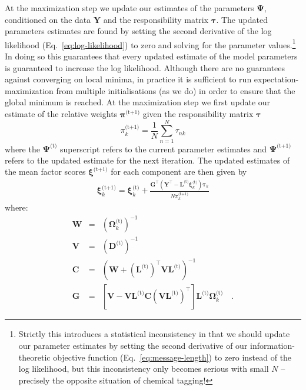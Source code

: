 \documentclass[twocolumn]{aastex62}
\newcommand{\vect}[1]{\boldsymbol{\mathbf{#1}}}
\renewcommand{\vec}[1]{\vect{#1}}
\newcommand{\weight}{\pi}
\newcommand{\data}{\textbf{Y}}
\newcommand{\vecdata}{\vec\data}
\newcommand{\nextstep}{^\textrm{(t+1)}}
\newcommand{\thisstep}{^\textrm{(t)}}
\newcommand{\transpose}{^\intercal}
\newcommand{\factorloads}{\textbf{L}}
\newcommand{\specificvariance}{\vec{D}}
\newcommand{\scoremeans}{\vec\xi}
\newcommand{\scorecovs}{\vec\Omega}
\newcommand{\NumData}{N}
\newcommand{\numdata}{n}
\newcommand{\numcomponents}{k}
\begin{document}
At the maximization step we update our estimates of the parameters $\vec\Psi$,
conditioned on the data $\vecdata$ and the responsibility matrix $\vec\tau$.
The updated parameters estimates are found by setting the second derivative
of the log likelihood (Eq.~\ref{eq:log-likelihood}) to zero and solving for
the parameter values.\footnote{Strictly this introduces a statistical inconsistency in that we should update our parameter estimates by setting the second derivative of our information-theoretic objective function (Eq.~\ref{eq:message-length}) to zero instead of the log likelihood, but this inconsistency only becomes serious with small $N$ -- precisely the opposite situation of chemical tagging!}
In doing so this guarantees that every updated
estimate of the model parameters is guaranteed to increase the log likelihood.
Although there are no guarantees against converging on local minima, in 
practice it is sufficient to run expectation-maximization from multiple
initialisations (as we do) in order to ensure that the global minimum is reached.
At the maximization step we first update our estimate of the relative weights 
$\vec\weight\nextstep$ given the responsibility matrix $\vec\tau$
\begin{equation}
	\weight_\numcomponents\nextstep = \frac{1}{\NumData} \sum_{\numdata=1}^{\NumData}\tau_{\numdata\numcomponents}
\end{equation}
\noindent{}where the $\vec{\Psi}\thisstep$ superscript refers to the current parameter estimates and $\vec{\Psi}\nextstep$ refers to the updated estimate for the next iteration.
The updated estimates of the mean factor scores 
$\scoremeans\nextstep$ for each component are then given by
\begin{eqnarray}
	\scoremeans_\numcomponents\nextstep = \scoremeans_\numcomponents\thisstep + \frac{\vec{G}\transpose(\vecdata\transpose - \factorloads\thisstep\scoremeans_\numcomponents\thisstep)\vec\tau_\numcomponents}{\NumData\weight_\numcomponents\nextstep}
\end{eqnarray}
\noindent{}where:
\begin{eqnarray}
	\vec{W} &=& (\scorecovs_\numcomponents\thisstep)^{-1} \\
	\vec{V} &=& \left(\specificvariance\thisstep\right)^{-1} \\
	\vec{C} &=& (\vec{W} + (\factorloads\thisstep)\transpose\vec{V}\factorloads\thisstep)^{-1} \\
	\vec{G} &=& \left[\vec{V} - \vec{V}\factorloads\thisstep\vec{C}\left(\vec{V}\factorloads\thisstep\right)\transpose\right]\factorloads\thisstep\scorecovs_k\thisstep \quad .
\end{eqnarray}
\end{document}
